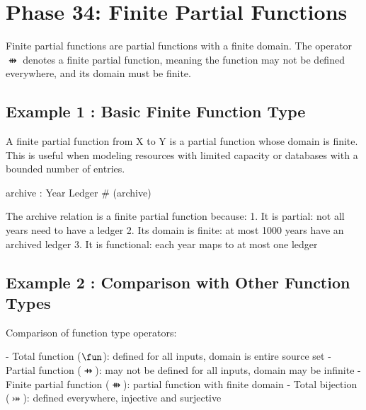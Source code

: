 \documentclass[a4paper,10pt,fleqn]{article}
\begin{document}
\section*{Phase 34: Finite Partial Functions}

\noindent Finite partial functions are partial functions with a finite domain. The operator $\ffun$ denotes a finite partial function, meaning the function may not be defined everywhere, and its domain must be finite.

\bigskip

\subsection*{Example 1 : Basic Finite Function Type}

\noindent A finite partial function from X to Y is a partial function whose domain is finite. This is useful when modeling resources with limited capacity or databases with a bounded number of entries.

\bigskip

\begin{zed}
\end{zed}

\begin{axdef}
archive : Year \ffun Ledger
\where
\# (\dom archive) 
\end{axdef}

\noindent The archive relation is a finite partial function because: 1. It is partial: not all years need to have a ledger 2. Its domain is finite: at most 1000 years have an archived ledger 3. It is functional: each year maps to at most one ledger

\bigskip

\subsection*{Example 2 : Comparison with Other Function Types}

\noindent Comparison of function type operators:

\bigskip

\noindent - Total function ($\fun$): defined for all inputs, domain is entire source set - Partial function ($\pfun$): may not be defined for all inputs, domain may be infinite - Finite partial function ($\ffun$): partial function with finite domain - Total bijection ($\bij$): defined everywhere, injective and surjective
\end{document}

